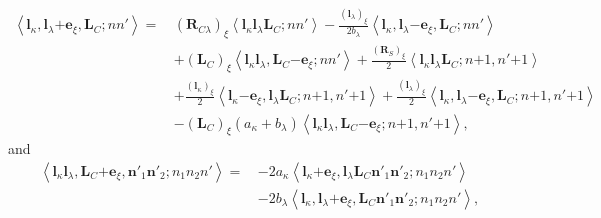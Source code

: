 \documentclass[a4paper,11pt,twoside,openright]{book}
\begin{document}
%
\begin{align}
  \left\langle\boldsymbol{l}_{\kappa},%
    \boldsymbol{l}_{\lambda}\mathrm{+}\boldsymbol{e}_{\xi},\boldsymbol{L}_{C};nn'\right\rangle
  =\,&(\boldsymbol{R}_{C\lambda})_{\xi}%
    \left\langle\boldsymbol{l}_{\kappa}\boldsymbol{l}_{\lambda}\boldsymbol{L}_{C};nn'\right\rangle
  -\frac{(\boldsymbol{l}_{\lambda})_{\xi}}{2b_{\lambda}}%
    \left\langle\boldsymbol{l}_{\kappa},%
    \boldsymbol{l}_{\lambda}\mathrm{-}\boldsymbol{e}_{\xi},\boldsymbol{L}_{C};nn'\right\rangle\\
  &+(\boldsymbol{L}_{C})_{\xi}%
    \left\langle\boldsymbol{l}_{\kappa}\boldsymbol{l}_{\lambda},%
    \boldsymbol{L}_{C}\mathrm{-}\boldsymbol{e}_{\xi};nn'\right\rangle%
  +\frac{(\boldsymbol{R}_S)_{\xi}}{2}%
    \left\langle\boldsymbol{l}_{\kappa}\boldsymbol{l}_{\lambda}%
      \boldsymbol{L}_{C};n\mathrm{+}1,n'\mathrm{+}1\right\rangle\nonumber\\
  &+\frac{(\boldsymbol{l}_{\kappa})_{\xi}}{2}%
    \left\langle\boldsymbol{l}_{\kappa}\mathrm{-}\boldsymbol{e}_{\xi},\boldsymbol{l}_{\lambda}%
      \boldsymbol{L}_{C};n\mathrm{+}1,n'\mathrm{+}1\right\rangle
  +\frac{(\boldsymbol{l}_{\lambda})_{\xi}}{2}%
    \left\langle\boldsymbol{l}_{\kappa},\boldsymbol{l}_{\lambda}\mathrm{-}\boldsymbol{e}_{\xi},%
      \boldsymbol{L}_{C};n\mathrm{+}1,n'\mathrm{+}1\right\rangle\nonumber\\
  &-(\boldsymbol{L}_{C})_{\xi}(a_{\kappa}+b_{\lambda})%
    \left\langle\boldsymbol{l}_{\kappa}\boldsymbol{l}_{\lambda},%
      \boldsymbol{L}_{C}\mathrm{-}\boldsymbol{e}_{\xi};n\mathrm{+}1,n'\mathrm{+}1\right\rangle,\nonumber
\end{align}
and
\begin{align}
  \left\langle\boldsymbol{l}_{\kappa}\boldsymbol{l}_{\lambda},%
    \boldsymbol{L}_{C}\mathrm{+}\boldsymbol{e}_{\xi},%
    \boldsymbol{n}'_{1}\boldsymbol{n}'_{2};n_{1}n_{2}n'\right\rangle
  =\,&-2a_{\kappa}\left\langle\boldsymbol{l}_{\kappa}\mathrm{+}\boldsymbol{e}_{\xi},%
    \boldsymbol{l}_{\lambda}\boldsymbol{L}_{C}%
    \boldsymbol{n}'_{1}\boldsymbol{n}'_{2};n_{1}n_{2}n'\right\rangle\\
  &-2b_{\lambda}\left\langle\boldsymbol{l}_{\kappa},%
    \boldsymbol{l}_{\lambda}\mathrm{+}\boldsymbol{e}_{\xi},%
    \boldsymbol{L}_{C}\boldsymbol{n}'_{1}\boldsymbol{n}'_{2};n_{1}n_{2}n'\right\rangle,\nonumber
\end{align}
%
\end{document}
